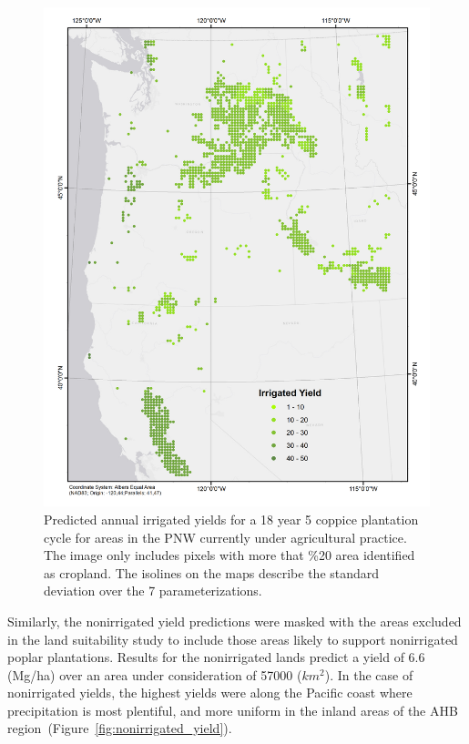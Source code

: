 \documentclass[preprint,12pt]{elsarticle}
\begin{document}
\begin{figure}[hp]
  \centering
  \includegraphics[width=1.0\linewidth]{irrigated_yield}
  \caption{Predicted annual irrigated yields for a 18 year 5 coppice plantation cycle for areas in the \ac{PNW} currently under agricultural practice.  The image only includes pixels with more that \%20 area identified as cropland.  The isolines on the maps describe the standard deviation over the 7 parameterizations.}
  \label{fig:irrigated_yield}
\end{figure}

Similarly, the nonirrigated yield predictions were masked with the
areas excluded in the land suitability study to include those areas
likely to support nonirrigated poplar plantations.  Results for the
nonirrigated lands predict a yield of 6.6 (Mg/ha) over an area under
consideration of 57000 ($km^2$).  In the case of nonirrigated yields, the
highest yields were along the Pacific coast where precipitation is
most plentiful, and more uniform in the inland areas of the \ac{AHB}
region~(Figure~\ref{fig:nonirrigated_yield}).
\end{document}
